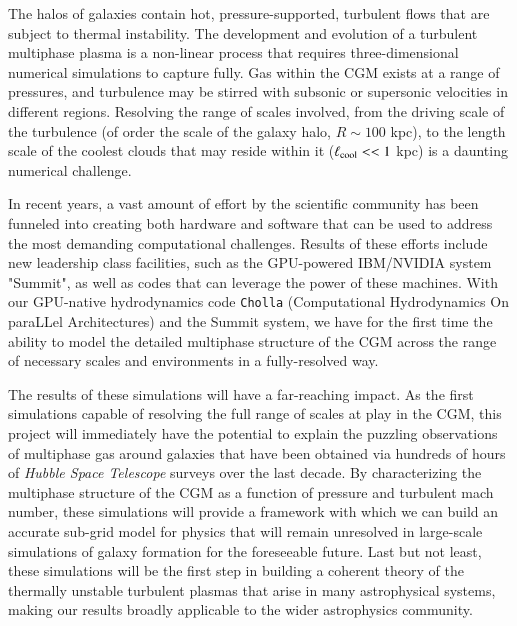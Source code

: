 \documentclass[11pt,letterpaper,english]{article}
\begin{document}
The halos of galaxies contain hot, pressure-supported, turbulent flows that are subject to thermal instability. The development and evolution of a turbulent multiphase plasma is a non-linear process that requires three-dimensional numerical simulations to capture fully. Gas within the CGM exists at a range of pressures, and turbulence may be stirred with subsonic or supersonic velocities in different regions. Resolving the range of scales involved, from the driving scale of the turbulence (of order the scale of the galaxy halo, $R\sim 100$ kpc), to the length scale of the coolest clouds that may reside within it ($\ell_{\rm cool} << 1$ kpc) is a daunting numerical challenge.
\vspace{.15in}

In recent years, a vast amount of effort by the scientific community has been funneled into creating both hardware and software that can be used to address the most demanding computational challenges. Results of these efforts include new leadership class facilities, such as the GPU-powered IBM/NVIDIA system "Summit", as well as codes that can leverage the power of these machines. With our GPU-native hydrodynamics code {\tt Cholla} (Computational Hydrodynamics On paraLLel Architectures) and the Summit system, we have for the first time the ability to model the detailed multiphase structure of the CGM across the range of necessary scales and environments in a fully-resolved way.
\vspace{.15in}

The results of these simulations will have a far-reaching impact. As the first simulations capable of resolving the full range of scales at play in the CGM, this project will immediately have the potential to explain the puzzling observations of multiphase gas around galaxies that have been obtained via hundreds of hours of {\it Hubble Space Telescope} surveys over the last decade. By characterizing the multiphase structure of the CGM as a function of pressure and turbulent mach number, these simulations will provide a framework with which we can build an accurate sub-grid model for physics that will remain unresolved in large-scale simulations of galaxy formation for the foreseeable future. Last but not least, these simulations will be the first step in building a coherent theory of the thermally unstable turbulent plasmas that arise in many astrophysical systems, making our results broadly applicable to the wider astrophysics community.

\end{document}
